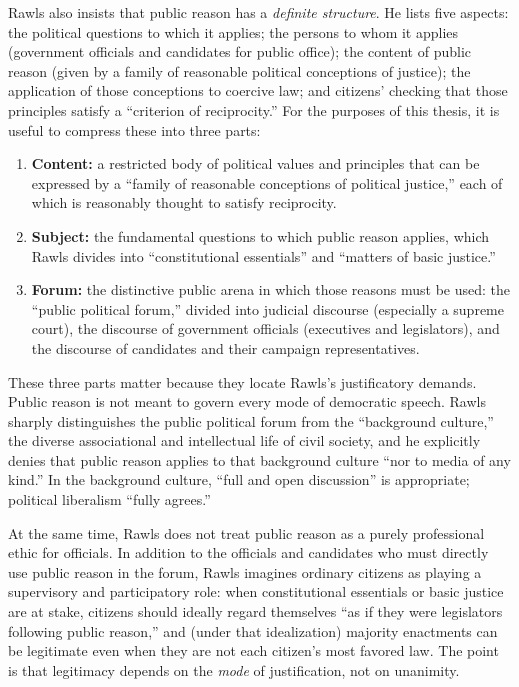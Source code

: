 \documentclass[12pt]{report}
\begin{document}
Rawls also insists that public reason has a \emph{definite structure}. He lists five aspects: the political questions to which it applies; the persons to whom it applies (government officials and candidates for public office); the content of public reason (given by a family of reasonable political conceptions of justice); the application of those conceptions to coercive law; and citizens’ checking that those principles satisfy a “criterion of reciprocity.”\parencite[p.~767]{rawls1997public} For the purposes of this thesis, it is useful to compress these into three parts:

\begin{enumerate}
  \item \textbf{Content:} a restricted body of political values and principles that can be expressed by a “family of reasonable conceptions of political justice,” each of which is reasonably thought to satisfy reciprocity.\parencite[p.~767]{rawls1997public}
  \item \textbf{Subject:} the fundamental questions to which public reason applies, which Rawls divides into “constitutional essentials” and “matters of basic justice.”\parencite[p.~767]{rawls1997public}
  \item \textbf{Forum:} the distinctive public arena in which those reasons must be used: the “public political forum,” divided into judicial discourse (especially a supreme court), the discourse of government officials (executives and legislators), and the discourse of candidates and their campaign representatives.\parencite[p.~767]{rawls1997public}
\end{enumerate}

These three parts matter because they locate Rawls’s justificatory demands. Public reason is not meant to govern every mode of democratic speech. Rawls sharply distinguishes the public political forum from the “background culture,” the diverse associational and intellectual life of civil society, and he explicitly denies that public reason applies to that background culture “nor to media of any kind.”\parencite[p.~768]{rawls1997public} In the background culture, “full and open discussion” is appropriate; political liberalism “fully agrees.”\parencite[p.~768]{rawls1997public}

At the same time, Rawls does not treat public reason as a purely professional ethic for officials. In addition to the officials and candidates who must directly use public reason in the forum, Rawls imagines ordinary citizens as playing a supervisory and participatory role: when constitutional essentials or basic justice are at stake, citizens should ideally regard themselves “as if they were legislators following public reason,” and (under that idealization) majority enactments can be legitimate even when they are not each citizen’s most favored law.\parencite[p.~771]{rawls1997public} The point is that legitimacy depends on the \emph{mode} of justification, not on unanimity.
\end{document}
